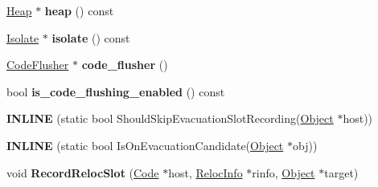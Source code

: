 \begin{DoxyCompactItemize}
\item 
\hyperlink{classv8_1_1internal_1_1_heap}{Heap} $\ast$ {\bfseries heap} () const \hypertarget{classv8_1_1internal_1_1_mark_compact_collector_aaa73def4a7ae4b9a7db82e5a32c0b33a}{}\label{classv8_1_1internal_1_1_mark_compact_collector_aaa73def4a7ae4b9a7db82e5a32c0b33a}

\item 
\hyperlink{classv8_1_1internal_1_1_isolate}{Isolate} $\ast$ {\bfseries isolate} () const \hypertarget{classv8_1_1internal_1_1_mark_compact_collector_ac6075dff51b436df71b31bc53dbc0566}{}\label{classv8_1_1internal_1_1_mark_compact_collector_ac6075dff51b436df71b31bc53dbc0566}

\item 
\hyperlink{classv8_1_1internal_1_1_code_flusher}{Code\+Flusher} $\ast$ {\bfseries code\+\_\+flusher} ()\hypertarget{classv8_1_1internal_1_1_mark_compact_collector_a203799662355152e55edf0e31cb9e93b}{}\label{classv8_1_1internal_1_1_mark_compact_collector_a203799662355152e55edf0e31cb9e93b}

\item 
bool {\bfseries is\+\_\+code\+\_\+flushing\+\_\+enabled} () const \hypertarget{classv8_1_1internal_1_1_mark_compact_collector_afcf4e7d0c281330a79337b0e85a657f1}{}\label{classv8_1_1internal_1_1_mark_compact_collector_afcf4e7d0c281330a79337b0e85a657f1}

\item 
{\bfseries I\+N\+L\+I\+NE} (static bool Should\+Skip\+Evacuation\+Slot\+Recording(\hyperlink{classv8_1_1internal_1_1_object}{Object} $\ast$host))\hypertarget{classv8_1_1internal_1_1_mark_compact_collector_aa76e8cef7393277d9efeb6df20d77e44}{}\label{classv8_1_1internal_1_1_mark_compact_collector_aa76e8cef7393277d9efeb6df20d77e44}

\item 
{\bfseries I\+N\+L\+I\+NE} (static bool Is\+On\+Evacuation\+Candidate(\hyperlink{classv8_1_1internal_1_1_object}{Object} $\ast$obj))\hypertarget{classv8_1_1internal_1_1_mark_compact_collector_a6f531de7acd29e99abfb8d177b847924}{}\label{classv8_1_1internal_1_1_mark_compact_collector_a6f531de7acd29e99abfb8d177b847924}

\item 
void {\bfseries Record\+Reloc\+Slot} (\hyperlink{classv8_1_1internal_1_1_code}{Code} $\ast$host, \hyperlink{classv8_1_1internal_1_1_reloc_info}{Reloc\+Info} $\ast$rinfo, \hyperlink{classv8_1_1internal_1_1_object}{Object} $\ast$target)\hypertarget{classv8_1_1internal_1_1_mark_compact_collector_adcab026e505c1ac9962a29872c704c19}{}\label{classv8_1_1internal_1_1_mark_compact_collector_adcab026e505c1ac9962a29872c704c19}


\end{DoxyCompactItemize}
